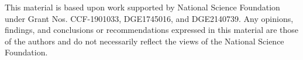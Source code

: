 This material is based upon work supported by National Science Foundation under Grant Nos. CCF-1901033, DGE1745016, and DGE2140739. Any opinions, findings, and conclusions or recommendations expressed in this material are those of the authors and do not necessarily reflect the views of the National Science Foundation.